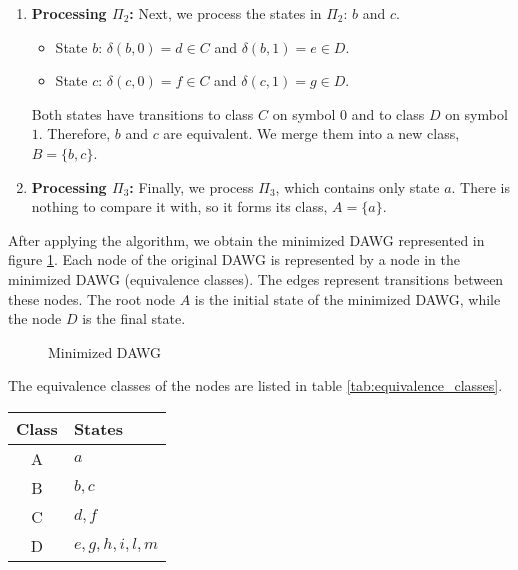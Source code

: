 \begin{example}
\begin{enumerate}
        \item \textbf{Processing $\Pi_2$:} Next, we process the states in $\Pi_2$: $b$ and $c$.
        \begin{itemize}
            \item State $b$: $\delta(b, 0) = d \in C$ and $\delta(b, 1) = e \in D$.
            \item State $c$: $\delta(c, 0) = f \in C$ and $\delta(c, 1) = g \in D$.
        \end{itemize}
        Both states have transitions to class $C$ on symbol $0$ and to class $D$ on symbol $1$. Therefore, $b$ and $c$ are equivalent. We merge them into a new class, $B = \{b, c\}$.

        \item \textbf{Processing $\Pi_3$:} Finally, we process $\Pi_3$, which contains only state $a$. There is nothing to compare it with, so it forms its class, $A = \{a\}$.
    \end{enumerate}

    After applying the algorithm, we obtain the minimized DAWG represented in figure \cref{fig:example_minimized_dawg}. Each node of the original DAWG is represented by a node in the minimized DAWG (equivalence classes). The edges represent transitions between these nodes. The root node $A$ is the initial state of the minimized DAWG, while the node $D$ is the final state.
    \begin{figure}[H]
        \centering
        \caption{Minimized DAWG}
        \label{fig:example_minimized_dawg}
    \end{figure}      

    The equivalence classes of the nodes are listed in table \cref{tab:equivalence_classes}.
    \begin{center}
        \begin{tabular}{|c|l|}
        \hline
        \textbf{Class} & \textbf{States} \\
        \hline
        A & $a$ \\
        B & $b, c$ \\
        C & $d, f$ \\
        D & $e, g, h, i, l, m$ \\
        \hline
        \end{tabular}
        \label{tab:equivalence_classes}
    \end{center}
\end{example}
